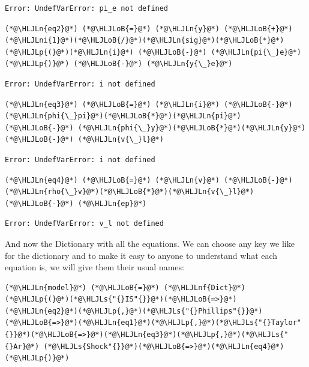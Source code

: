 \documentclass[12pt,a4paper]{article}
\newcommand{\HLJLn}[1]{#1}
\newcommand{\HLJLnf}[1]{\textcolor[RGB]{66,102,213}{#1}}
\newcommand{\HLJLs}[1]{\textcolor[RGB]{201,61,57}{#1}}
\newcommand{\HLJLni}[1]{\textcolor[RGB]{59,151,46}{#1}}
\newcommand{\HLJLoB}[1]{\textcolor[RGB]{102,102,102}{\textbf{#1}}}
\newcommand{\HLJLp}[1]{#1}
\begin{document}
\begin{lstlisting}
Error: UndefVarError: pi_e not defined
\end{lstlisting}


\begin{lstlisting}
(*@\HLJLn{eq2}@*) (*@\HLJLoB{=}@*) (*@\HLJLn{y}@*) (*@\HLJLoB{+}@*) (*@\HLJLni{1}@*)(*@\HLJLoB{/}@*)(*@\HLJLn{sig}@*)(*@\HLJLoB{*}@*)(*@\HLJLp{(}@*)(*@\HLJLn{i}@*) (*@\HLJLoB{-}@*) (*@\HLJLn{pi{\_}e}@*)(*@\HLJLp{)}@*) (*@\HLJLoB{-}@*) (*@\HLJLn{y{\_}e}@*)
\end{lstlisting}

\begin{lstlisting}
Error: UndefVarError: i not defined
\end{lstlisting}


\begin{lstlisting}
(*@\HLJLn{eq3}@*) (*@\HLJLoB{=}@*) (*@\HLJLn{i}@*) (*@\HLJLoB{-}@*) (*@\HLJLn{phi{\_}pi}@*)(*@\HLJLoB{*}@*)(*@\HLJLn{pi}@*) (*@\HLJLoB{-}@*) (*@\HLJLn{phi{\_}y}@*)(*@\HLJLoB{*}@*)(*@\HLJLn{y}@*) (*@\HLJLoB{-}@*) (*@\HLJLn{v{\_}l}@*)
\end{lstlisting}

\begin{lstlisting}
Error: UndefVarError: i not defined
\end{lstlisting}


\begin{lstlisting}
(*@\HLJLn{eq4}@*) (*@\HLJLoB{=}@*) (*@\HLJLn{v}@*) (*@\HLJLoB{-}@*) (*@\HLJLn{rho{\_}v}@*)(*@\HLJLoB{*}@*)(*@\HLJLn{v{\_}l}@*) (*@\HLJLoB{-}@*) (*@\HLJLn{ep}@*)
\end{lstlisting}

\begin{lstlisting}
Error: UndefVarError: v_l not defined
\end{lstlisting}


And now the Dictionary with all the equations. We can choose any key we like for the dictionary and to make it easy to anyone to understand what each equation is, we will give them their usual names:


\begin{lstlisting}
(*@\HLJLn{model}@*) (*@\HLJLoB{=}@*) (*@\HLJLnf{Dict}@*)(*@\HLJLp{(}@*)(*@\HLJLs{"{}IS"{}}@*)(*@\HLJLoB{=>}@*)(*@\HLJLn{eq2}@*)(*@\HLJLp{,}@*)(*@\HLJLs{"{}Phillips"{}}@*)(*@\HLJLoB{=>}@*)(*@\HLJLn{eq1}@*)(*@\HLJLp{,}@*)(*@\HLJLs{"{}Taylor"{}}@*)(*@\HLJLoB{=>}@*)(*@\HLJLn{eq3}@*)(*@\HLJLp{,}@*)(*@\HLJLs{"{}Ar}@*) (*@\HLJLs{Shock"{}}@*)(*@\HLJLoB{=>}@*)(*@\HLJLn{eq4}@*)(*@\HLJLp{)}@*)
\end{lstlisting}
\end{document}

